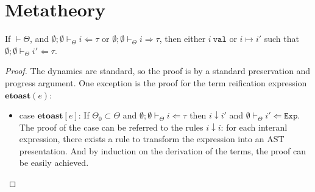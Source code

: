 \documentclass{sig-alternate}[10pt]
\begin{document}
\section{Metatheory}
\begin{theorem}
If $\vdash\Theta$, and $\emptyset;\emptyset\vdash_{\Theta}i\Leftarrow\tau$ or $\emptyset;\emptyset\vdash_{\Theta}i\Rightarrow\tau$, then either $i~\texttt{val}$ or $i\mapsto i'$ such that $\emptyset;\emptyset\vdash_{\Theta}i'\Leftarrow\tau$.
\end{theorem}
\begin{proof}
The dynamics are standard, so the proof is by a standard preservation and progress argument. One exception is the proof for the term reification expression $\mathbf{etoast}(e)$:
\begin{itemize}
\item {case $\mathbf{etoast}[e]$: If $\Theta_0\subset\Theta$ and $\emptyset;\emptyset\vdash_{\Theta}i\Leftarrow\tau$ then $i\downarrow i'$ and $\emptyset\vdash_{\Theta}i'\Leftarrow\mathtt{Exp}$.}
\\
The proof of the case can be referred to the rules $i\downarrow i$: for each interanl expression, there exists a rule to transform the expression into an AST presentation. And by induction on the derivation of the terms, the proof can be easily achieved.
\end{itemize}
\end{proof}
\end{document}

